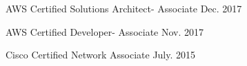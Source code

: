 

\begin{cventries}

  \cvcert
    {AWS Certified Solutions Architect- Associate} %
    {Dec. 2017} %

  \cvcert
    {AWS Certified Developer- Associate} %
    {Nov. 2017} %

  \cvcert
    {Cisco Certified Network Associate} %
    {July. 2015} %

\end{cventries}
